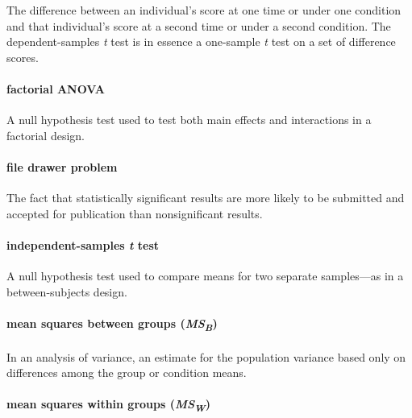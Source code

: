 \documentclass[
]{krantz}
\begin{document}
The difference between an individual's score at one time or under one condition and that individual's score at a second time or under a second condition. The dependent-samples \emph{t} test is in essence a one-sample \emph{t} test on a set of difference scores.

\paragraph*{factorial ANOVA}\label{factorial-anova-1}

A null hypothesis test used to test both main effects and interactions in a factorial design.

\paragraph*{file drawer problem}\label{file-drawer-problem}

The fact that statistically significant results are more likely to be submitted and accepted for publication than nonsignificant results.

\paragraph*{\texorpdfstring{independent-samples \emph{t} test}{independent-samples t test}}\label{independent-samples-t-test}

A null hypothesis test used to compare means for two separate samples---as in a between-subjects design.

\paragraph*{\texorpdfstring{mean squares between groups (\emph{MS\textsubscript{B}})}{mean squares between groups (MSB)}}\label{mean-squares-between-groups-msb}

In an analysis of variance, an estimate for the population variance based only on differences among the group or condition means.

\paragraph*{\texorpdfstring{mean squares within groups (\emph{MS\textsubscript{W}})}{mean squares within groups (MSW)}}\label{mean-squares-within-groups-msw}
\end{document}
